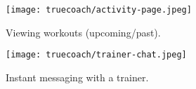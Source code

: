 \begin{figure}[H]
    \centering
    \begin{minipage}{0.4\textwidth}
        \centering
        \texttt{[image: truecoach/activity-page.jpeg]}
        \caption{Viewing workouts (upcoming/past).}
        \label{fig:tc-activity}
    \end{minipage}\qquad
    \begin{minipage}{0.4\textwidth}
        \centering
        \texttt{[image: truecoach/trainer-chat.jpeg]}
        \caption{Instant messaging with a trainer.}
        \label{fig:tc-user-chat}
    \end{minipage}%
\end{figure}
